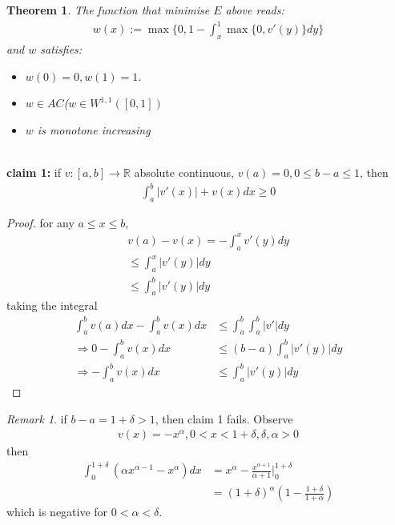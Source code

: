 \documentclass[a4paper,12pt,oneside,fleqn]{book}
\newtheorem{theorem}{Theorem}[section]
\theoremstyle{definition}
\theoremstyle{remark}
\newtheorem*{remark}{Remark}
\begin{document}
\begin{theorem}
	The function that minimise $E$ above reads:
	\begin{align*}
		w(x) := \max\{0, 1 - \int_x^1 \max\{0, v'(y)\}dy\}
	\end{align*}
	and $w$ satisfies:
	\begin{itemize}
		\item $w(0) = 0, w(1) = 1$.
		\item $w \in AC$($w \in W^{1, 1}([0, 1])$
		\item $w$ is monotone increasing
	\end{itemize}
\end{theorem}

\quad\\
\textbf{claim 1:} if $v: [a, b] \rightarrow \mathbb{R}$ absolute continuous, $v(a) = 0, 0 \le b - a \le 1$, then 
\begin{align*}
	\int_a^b |v'(x)| + v(x) dx \geq 0
\end{align*}

\begin{proof}
	for any $a \le x \le b$, 
	\begin{align*}
		v(a) - v(x) = - \int_a^x v'(y)dy\\
		\le \int_a^x |v'(y)|dy\\
		\le \int_a^b |v'(y)|dy 
	\end{align*}
	taking the integral
	\begin{align*}
		\int_a^b v(a)dx - \int_a^b v(x) dx &\le \int_a^b\int_a^b |v'|dy\\
		\Rightarrow
		0-\int_a^b v(x) dx &\le  (b-a) \int_a^b|v'(y)|dy\\
		\Rightarrow
		-\int_a^b v(x) dx &\le \int_a^b|v'(y)|dy
	\end{align*}
\end{proof}

\begin{remark}
if $b-a = 1 + \delta > 1$, then claim 1 fails. Observe
\begin{align*}
	v(x) = - x^\alpha, 0 < x < 1 + \delta, \delta , \alpha >0
\end{align*}	
then 
\begin{align*}
	\int_0^{1+\delta} ( \alpha x^{\alpha - 1} - x^\alpha) dx &= x^\alpha - \frac{x^{\alpha + 1}}{\alpha + 1}|_0^{1 + \delta}\\
	&= ( 1 + \delta)^\alpha (1 - \frac{1+ \delta}{1 + \alpha})
\end{align*}
which is negative for $0 < \alpha < \delta$. 
\end{remark}
\end{document}

